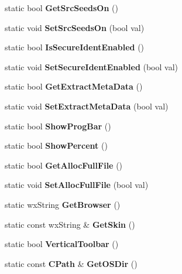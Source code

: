\begin{DoxyCompactItemize}
\item 
static bool {\bfseries GetSrcSeedsOn} ()\label{classCPreferences_a5fbc5cadf7885ea9a13d67549d9de195}

\item 
static void {\bfseries SetSrcSeedsOn} (bool val)\label{classCPreferences_a94a5f4b33c4ecf2d0983aee376e2bedd}

\item 
static bool {\bfseries IsSecureIdentEnabled} ()\label{classCPreferences_a3f18497a167eaf0ebc09f58524b17358}

\item 
static void {\bfseries SetSecureIdentEnabled} (bool val)\label{classCPreferences_a2347eb4579808d8c644a13b821ea4c1a}

\item 
static bool {\bfseries GetExtractMetaData} ()\label{classCPreferences_afd3dba8947e7a5409b6c6fb7c442b99e}

\item 
static void {\bfseries SetExtractMetaData} (bool val)\label{classCPreferences_a0b08aa57fa9e67a5517e9276d4813e35}

\item 
static bool {\bfseries ShowProgBar} ()\label{classCPreferences_aaca129868ca04e7b71b2f8da439d5eab}

\item 
static bool {\bfseries ShowPercent} ()\label{classCPreferences_a48f388ab18f3da2ac28dd9b02e3fdc72}

\item 
static bool {\bfseries GetAllocFullFile} ()\label{classCPreferences_ac27a5dd68715896b186ced476a028212}

\item 
static void {\bfseries SetAllocFullFile} (bool val)\label{classCPreferences_ad38e7cffdc521c642b3bb0c5f6a8166b}

\item 
static wxString {\bfseries GetBrowser} ()\label{classCPreferences_aaeb15f1774d85e48d0f5c3b4eaaabc51}

\item 
static const wxString \& {\bfseries GetSkin} ()\label{classCPreferences_af0757cc1ed6328263a483fa69410a00b}

\item 
static bool {\bfseries VerticalToolbar} ()\label{classCPreferences_ae77aacfeba5b173c1a353fcdb179541c}

\item 
static const {\bf CPath} \& {\bfseries GetOSDir} ()\label{classCPreferences_aabad7684d8d1519405b1976a96c177d6}


\end{DoxyCompactItemize}

